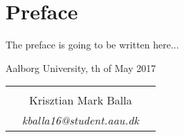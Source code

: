 \chapter*{Preface}

The preface is going to be written here... 

\hfill Aalborg University, th of May 2017




\vfill

\begin{table}[H]
	\centering
		\begin{tabular}{c c c}
			& \underline{\phantom{mmmmmmmmmmmmmmmmmmm}} 	& \\
			& Krisztian Mark Balla					& \\
			& \textit{kballa16@student.aau.dk}		& \\
		\end{tabular}
\end{table}